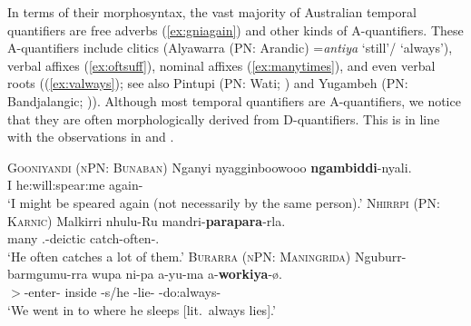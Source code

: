 \documentclass[12pt,egregdoesnotlikesansseriftitles]{scrartcl}
\begin{document}
In terms of their morphosyntax, the vast majority of Australian temporal quantifiers are free adverbs (\ref{ex:gniagain}) and other kinds of A-quantifiers. These A-quantifiers include clitics (Alyawarra (PN: Arandic) =\textit{antiya} `still'/ `always'), verbal affixes (\ref{ex:oftsuff}), %
nominal affixes (\ref{ex:manytimes}), and even verbal roots ((\ref{ex:valways}); see also Pintupi (PN: Wati; ) and Yugambeh (PN: Bandjalangic; )). Although most temporal quantifiers are A-quantifiers, we notice that they are often morphologically derived from D-quantifiers. This is in line with the observations in \cite{gil93} and \cite{keenanpaperno17ov}.
\begin{exe}
  \ex\label{ex:gniagain} \textsc{Gooniyandi (nPN: Bunaban)}\hfill {}
  \gll Nganyi nyagginboowooo \textbf{ngambiddi}-nyali.\\
  I he:will:spear:me again-\Rep\\
  \glt `I might be speared again (not necessarily by the same person).'
  \ex\label{ex:oftsuff} \textsc{Nhirrpi (PN: Karnic)}\hfill {}
  \gll Malkirri nhulu-Ru mandri-\textbf{parapara}-rla.\\
  many \Tsg.\Erg-deictic catch-often-\Prs.\Prog\\
  `He often catches a lot of them.'
  \ex\label{ex:valways} \textsc{Burarra (nPN: Maningrida)}\hfill {}
  \gll Nguburr-barmgumu-rra wupa ni-pa a-yu-ma a-\textbf{workiya}-ø.\\
  \First$>$\Second\Aug-enter-\Pc{} inside \Third\Min-s/he  \Third\Min-lie-\Ctp{} \Third\Min-do:always-\Ctp\\
  \glt `We went in to where he sleeps [lit.\ always lies].'
\end{exe}
\end{document}
